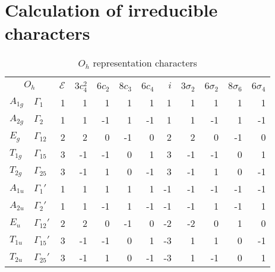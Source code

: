 \documentclass[twocolumn,showpacs,preprintnumbers,superscriptaddress,prb,floatfix,aps,10pt]{revtex4-1}
\newcommand*{\id}{\mathcal{E}}
\begin{document}
%
%
%
\section{Calculation of irreducible characters}

\begin{table}
\caption{\label{table:chi} $O_h$ representation characters}
\begin{ruledtabular}
\begin{tabular*}{10cm}{llrrrrrrrrrr}
\multicolumn{2}{c}{$O_h$}         &$\id$&3$c_4^2$& 6$c_2$ & 8$c_3$ & 6$c_4$ &  $i$ & 3$\sigma_2$ & 6$\sigma_2$ & 8$\sigma_6$ & 6$\sigma_4$ \\  
$A_{1g}$        & $\Gamma_{1}  $  &  1  &     1  &     1  &     1  &     1  &   1  &          1  &          1  &          1  &          1  \\         %
$A_{2g}$        & $\Gamma_{2}  $  &  1  &     1  &    -1  &     1  &    -1  &   1  &          1  &         -1  &          1  &         -1  \\         %
$E_g   $        & $\Gamma_{12} $  &  2  &     2  &     0  &    -1  &     0  &   2  &          2  &          0  &         -1  &          0  \\         %
$T_{1g}$        & $\Gamma_{15} $  &  3  &    -1  &    -1  &     0  &     1  &   3  &         -1  &         -1  &          0  &          1  \\         %
$T_{2g}$        & $\Gamma_{25} $  &  3  &    -1  &     1  &     0  &    -1  &   3  &         -1  &          1  &          0  &         -1  \\         %
$A_{1u}$        & $\Gamma_{1} '$  &  1  &     1  &     1  &     1  &     1  &  -1  &         -1  &         -1  &         -1  &         -1  \\         %
$A_{2u}$        & $\Gamma_{2} '$  &  1  &     1  &    -1  &     1  &    -1  &  -1  &         -1  &          1  &         -1  &          1  \\         %
$E_u   $        & $\Gamma_{12}'$  &  2  &     2  &     0  &    -1  &     0  &  -2  &         -2  &          0  &          1  &          0  \\         %
$T_{1u}$        & $\Gamma_{15}'$  &  3  &    -1  &    -1  &     0  &     1  &  -3  &          1  &          1  &          0  &         -1  \\         %
$T_{2u}$        & $\Gamma_{25}'$  &  3  &    -1  &     1  &     0  &    -1  &  -3  &          1  &         -1  &          0  &          1  \\ \hline  %

\end{tabular*}
\end{ruledtabular}
\end{table}
\end{document}

